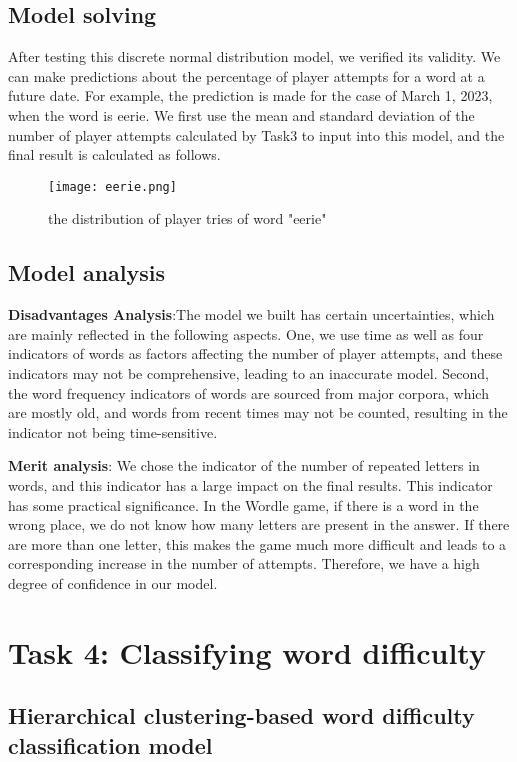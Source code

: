 \documentclass[12pt]{article}  %
\begin{document}
\subsection{Model solving}
	After testing this discrete normal distribution model, we verified its validity. We can make predictions about the percentage of player attempts for a word at a future date. For example, the prediction is made for the case of March 1, 2023, when the word is eerie. We first use the mean and standard deviation of the number of player attempts calculated by Task3 to input into this model, and the final result is calculated as follows.
 \begin{figure}[H]
	\centering
	\texttt{[image: eerie.png]}
	\caption{the distribution of player tries of word "eerie"}
	\label{img10}
\end{figure}

\subsection{Model analysis}
\textbf{Disadvantages Analysis}:The model we built has certain uncertainties, which are mainly reflected in the following aspects. One, we use time as well as four indicators of words as factors affecting the number of player attempts, and these indicators may not be comprehensive, leading to an inaccurate model. Second, the word frequency indicators of words are sourced from major corpora, which are mostly old, and words from recent times may not be counted, resulting in the indicator not being time-sensitive.

\textbf{Merit analysis}:
We chose the indicator of the number of repeated letters in words, and this indicator has a large impact on the final results. This indicator has some practical significance. In the Wordle game, if there is a word in the wrong place, we do not know how many letters are present in the answer. If there are more than one letter, this makes the game much more difficult and leads to a corresponding increase in the number of attempts. Therefore, we have a high degree of confidence in our model.

\section{Task 4: Classifying word difficulty}
\subsection{Hierarchical clustering-based word difficulty classification model}
\end{document}
